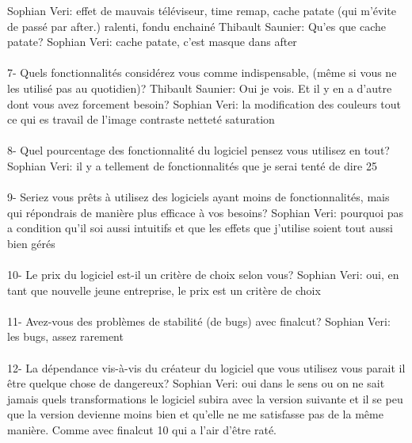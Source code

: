 Sophian Veri: effet de mauvais téléviseur, time remap, cache patate (qui m'évite
de passé par after.) ralenti, fondu enchainé
Thibault Saunier: Qu'es que cache patate?
Sophian Veri: cache patate, c'est masque dans after

\paragraph{}
7-  Quels fonctionnalités considérez vous comme indispensable, (même si vous
ne les utilisé pas au quotidien)?
Thibault Saunier: Oui je vois. Et il y en a d'autre dont vous avez forcement besoin?
Sophian Veri: la modification des couleurs  tout ce qui es travail de
l'image contraste netteté saturation

\paragraph{}
8- Quel pourcentage des fonctionnalité du logiciel pensez vous utilisez
en tout?
Sophian Veri: il y a  tellement de fonctionnalités que je serai tenté
de dire 25%

\paragraph{}
9- Seriez vous prêts à utilisez des logiciels ayant moins de fonctionnalités,
mais qui répondrais de manière plus efficace à vos besoins?
Sophian Veri: pourquoi pas a condition qu'il soi aussi intuitifs et que les effets
que j'utilise soient tout aussi bien gérés

\paragraph{}
10-  Le prix du logiciel est-il un critère de choix selon vous?
Sophian Veri: oui, en tant que nouvelle jeune entreprise, le prix est
un critère de choix

\paragraph{}
11- Avez-vous des problèmes de stabilité (de bugs) avec finalcut?
Sophian Veri: les bugs, assez rarement

\paragraph{}
12- La dépendance vis-à-vis du créateur du logiciel que vous utilisez
vous parait il être quelque chose de dangereux?
Sophian Veri: oui dans le sens ou on ne sait jamais quels transformations le
logiciel subira avec la version suivante et il se peu que la version devienne
moins bien et qu'elle ne me satisfasse pas de la même manière. Comme avec
finalcut 10 qui a l'air d'être raté.

